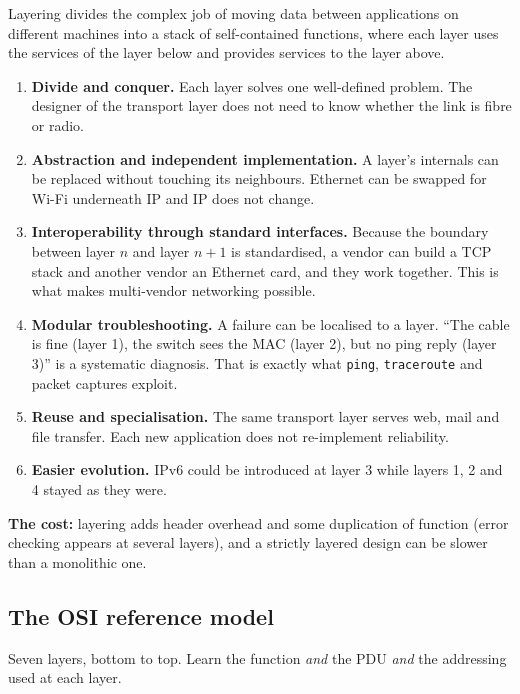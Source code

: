 \documentclass[11pt,a4paper]{article}
\begin{document}
\begin{solbox}
Layering divides the complex job of moving data between applications on different machines into a stack of self-contained functions, where each layer uses the services of the layer below and provides services to the layer above.

\begin{enumerate}
\item \textbf{Divide and conquer.} Each layer solves one well-defined problem. The designer of the transport layer does not need to know whether the link is fibre or radio.
\item \textbf{Abstraction and independent implementation.} A layer's internals can be replaced without touching its neighbours. Ethernet can be swapped for Wi-Fi underneath IP and IP does not change.
\item \textbf{Interoperability through standard interfaces.} Because the boundary between layer $n$ and layer $n+1$ is standardised, a vendor can build a TCP stack and another vendor an Ethernet card, and they work together. This is what makes multi-vendor networking possible.
\item \textbf{Modular troubleshooting.} A failure can be localised to a layer. ``The cable is fine (layer 1), the switch sees the MAC (layer 2), but no ping reply (layer 3)'' is a systematic diagnosis. That is exactly what \texttt{ping}, \texttt{traceroute} and packet captures exploit.
\item \textbf{Reuse and specialisation.} The same transport layer serves web, mail and file transfer. Each new application does not re-implement reliability.
\item \textbf{Easier evolution.} IPv6 could be introduced at layer 3 while layers 1, 2 and 4 stayed as they were.
\end{enumerate}

\textbf{The cost:} layering adds header overhead and some duplication of function (error checking appears at several layers), and a strictly layered design can be slower than a monolithic one.
\end{solbox}

\subsection{The OSI reference model}

Seven layers, bottom to top. Learn the function \emph{and} the PDU \emph{and} the addressing used at each layer.
\end{document}
